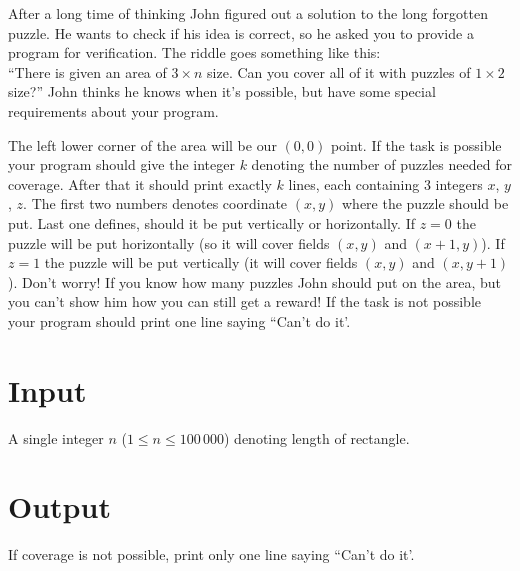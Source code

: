\documentclass{spiral}
\begin{document}
  \makeheader

  After a long time of thinking John figured out a solution to the long forgotten puzzle.
  He wants to check if his idea is correct, so he asked you to provide a program for verification.
  The riddle goes something like this:\\
  ``There is given an area of $3 \times n$ size. Can you cover all of it with puzzles of $1 \times 2$ size?''
  John thinks he knows when it's possible, but have some special requirements about your program.

  The left lower corner of the area will be our $(0, 0)$ point.
  If the task is possible your program should give the integer $k$
  denoting the number of puzzles needed for coverage.
  After that it should print exactly $k$ lines, each containing 3 integers $x$, $y$, $z$.
  The first two numbers denotes coordinate $(x, y)$ where the puzzle should be put.
  Last one defines, should it be put vertically or horizontally.
  If $z = 0$ the puzzle will be put horizontally (so it will cover fields $(x, y)$ and $(x + 1, y)$).
  If $z = 1$ the puzzle will be put vertically (it will cover fields $(x, y)$ and $(x, y + 1)$).
  Don't worry! If you know how many puzzles John should put on the area, but you can't show him how
  you can still get a reward!
  If the task is not possible your program should print one line saying ``Can't do it'.


  \section{Input}

    A single integer $n$ ($1 \leq n \leq 100\,000$) denoting length of rectangle.

  \section{Output}

    If coverage is not possible, print only one line saying ``Can't do it'.\\
    

\end{document}

